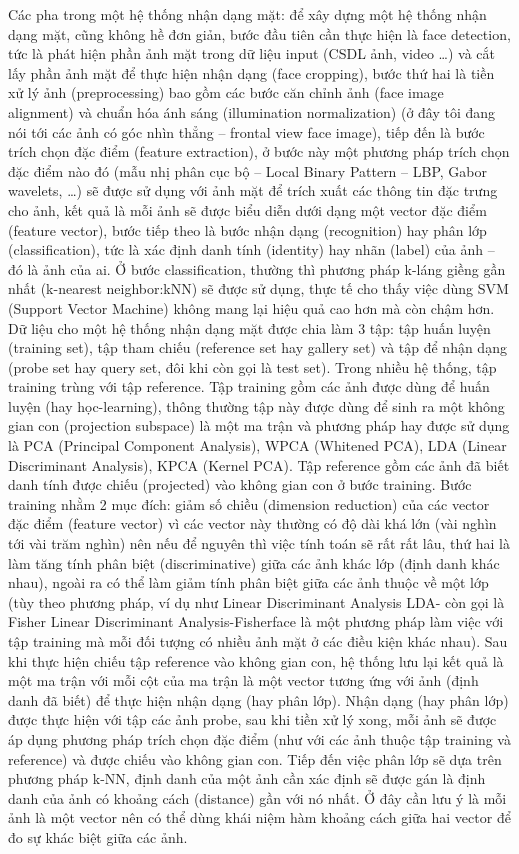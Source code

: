 Các pha trong một hệ thống nhận dạng mặt: để xây dựng một hệ thống nhận dạng mặt, cũng không hề đơn giản, bước đầu tiên cần thực hiện là face detection, tức là phát hiện phần ảnh mặt trong dữ liệu input (CSDL ảnh, video …) và cắt lấy phần ảnh mặt để thực hiện nhận dạng (face cropping), bước thứ hai là tiền xử lý ảnh (preprocessing) bao gồm các bước căn chỉnh ảnh (face image alignment) và chuẩn hóa ánh sáng (illumination normalization) (ở đây tôi đang nói tới các ảnh có góc nhìn thẳng – frontal view face image), tiếp đến là bước trích chọn đặc điểm (feature extraction), ở bước này một phương pháp trích chọn đặc điểm nào đó (mẫu nhị phân cục bộ – Local Binary Pattern – LBP, Gabor wavelets, …) sẽ được sử dụng với ảnh mặt để trích xuất các thông tin đặc trưng cho ảnh, kết quả là mỗi ảnh sẽ được biểu diễn dưới dạng một vector đặc điểm (feature vector), bước tiếp theo là bước nhận dạng (recognition) hay phân lớp (classification), tức là xác định danh tính (identity) hay nhãn (label) của ảnh – đó là ảnh của ai. Ở bước classification, thường thì phương pháp k-láng giềng gần nhất (k-nearest neighbor:kNN) sẽ được sử dụng, thực tế cho thấy việc dùng SVM (Support Vector Machine) không mang lại hiệu quả cao hơn mà còn chậm hơn. Dữ liệu cho một hệ thống nhận dạng mặt được chia làm 3 tập: tập huấn luyện (training set), tập tham chiếu (reference set hay gallery set) và tập để nhận dạng (probe set hay query set, đôi khi còn gọi là test set). Trong nhiều hệ thống, tập training trùng với tập reference. Tập training gồm các ảnh được dùng để huấn luyện (hay học-learning), thông thường tập này được dùng để sinh ra một không gian con (projection subspace) là một ma trận và phương pháp hay được sử dụng là PCA (Principal Component Analysis), WPCA (Whitened PCA), LDA (Linear Discriminant Analysis), KPCA (Kernel PCA). Tập reference gồm các ảnh đã biết danh tính được chiếu (projected) vào không gian con ở bước training. Bước training nhằm 2 mục đích: giảm số chiều (dimension reduction) của các vector đặc điểm (feature vector) vì các vector này thường có độ dài khá lớn (vài nghìn tới vài trăm nghìn) nên nếu để nguyên thì việc tính toán sẽ rất rất lâu, thứ hai là làm tăng tính phân biệt (discriminative) giữa các ảnh khác lớp (định danh khác nhau), ngoài ra có thể làm giảm tính phân biệt giữa các ảnh thuộc về một lớp (tùy theo phương pháp, ví dụ như Linear Discriminant Analysis LDA- còn gọi là Fisher Linear Discriminant Analysis-Fisherface là một phương pháp làm việc với tập training mà mỗi đối tượng có nhiều ảnh mặt ở các điều kiện khác nhau). Sau khi thực hiện chiếu tập reference vào không gian con, hệ thống lưu lại kết quả là một ma trận với mỗi cột của ma trận là một vector tương ứng với ảnh (định danh đã biết) để thực hiện nhận dạng (hay phân lớp). Nhận dạng (hay phân lớp) được thực hiện với tập các ảnh probe, sau khi tiền xử lý xong, mỗi ảnh sẽ được áp dụng phương pháp trích chọn đặc điểm (như với các ảnh thuộc tập training và reference) và được chiếu vào không gian con. Tiếp đến việc phân lớp sẽ dựa trên phương pháp k-NN, định danh của một ảnh cần xác định sẽ được gán là định danh của ảnh có khoảng cách (distance) gần với nó nhất. Ở đây cần lưu ý là mỗi ảnh là một vector nên có thể dùng khái niệm hàm khoảng cách giữa hai vector để đo sự khác biệt giữa các ảnh.

